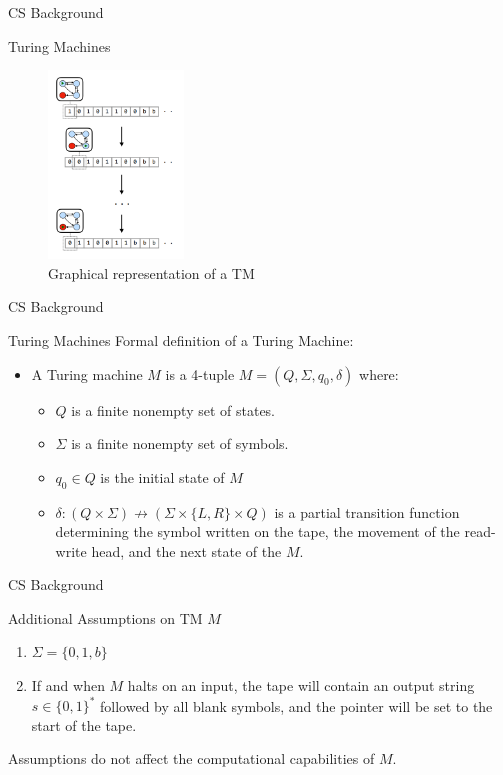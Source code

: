 \documentclass{beamer}
\begin{document}
\begin{frame}{CS Background}
    \begin{block}{Turing Machines}
        \begin{figure}
            \centering
            \includegraphics[height=5cm]{TM.png}
            \caption{Graphical representation of a TM}
            \label{fig:my_label}
        \end{figure}
    \end{block}
\end{frame}

\begin{frame}{CS Background}
\begin{block}{Turing Machines}
Formal definition of a Turing Machine:
    \begin{itemize}
        \item A Turing machine $M$ is a 4-tuple $M = (Q,\Sigma, q_0,\delta) $ where:
        \begin{itemize}
            \item $Q$ is a finite nonempty set of states.
            \item $\Sigma$ is a finite nonempty set of symbols.
            \item $q_0\in Q$ is the initial state of $M$
            \item $\delta: (Q\times \Sigma) \nrightarrow (\Sigma \times \{L,R\}\times Q)$ is a partial transition function determining the symbol written on the tape, the movement of the read-write head, and the next state of the $M$.
        \end{itemize}
    \end{itemize}
\end{block}
\end{frame}

\begin{frame}{CS Background}
    \begin{block}{Additional Assumptions on TM $M$}
    
    \begin{enumerate}
        \item $\Sigma = \{0,1,b\}$
        \item If and when $M$ halts on an input, the tape will contain an output string $s\in \{0,1\}^*$ followed by all blank symbols, and the pointer will be set to the start of the tape.
    \end{enumerate}
    Assumptions do not affect the computational capabilities of $M$.
    \end{block}
\end{frame}
    
\end{document}
